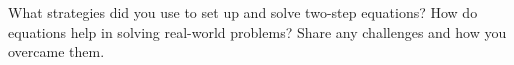 \documentclass[12pt]{article}
\begin{document}
\vspace{1em}

\begin{tcolorbox}[colframe=black!60, colback=white, 
coltitle=black, colbacktitle=black!15, fonttitle=\bfseries\Large, 
title=Reflection, halign title=center, left=10pt, right=10pt, top=10pt, bottom=110pt]
What strategies did you use to set up and solve two-step equations? How do equations help in solving real-world problems? Share any challenges and how you overcame them.
\end{tcolorbox}
\end{document}
